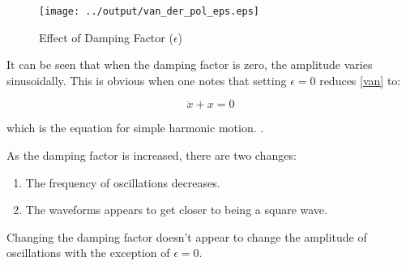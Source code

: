 \documentclass[12pt]{article}
\begin{document}
\begin{figure}[H]
  \centering
  \texttt{[image: ../output/van\_der\_pol\_eps.eps]}
  \caption{Effect of Damping Factor ($\epsilon$)}
  \label{fig:eps}
\end{figure}


It can be seen that when the damping factor is zero, the amplitude
varies sinusoidally. This is obvious when one notes that setting
$\epsilon = 0$ reduces \eqref{van} to:

\begin{equation}
\ddot{x} + x = 0
\end{equation}

which is the equation for simple harmonic motion. \cite{shm}.

As the damping factor is increased, there are two changes:

\begin{enumerate}
\item The frequency of oscillations decreases.
\item The waveforms appears to get closer to being a square wave.
\end{enumerate}

Changing the damping factor doesn't appear to change the amplitude of
oscillations with the exception of $\epsilon = 0$.



\end{document}
